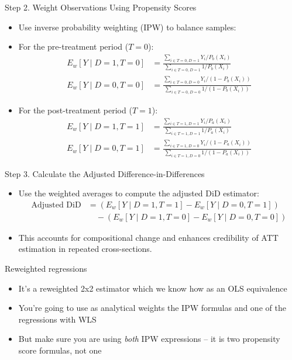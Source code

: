 \documentclass{beamer}
\begin{document}
\begin{frame}{Step 2. Weight Observations Using Propensity Scores}
\begin{itemize}
  \item Use inverse probability weighting (IPW) to balance samples:
    \item For the pre-treatment period (\( T = 0 \)):
  \begin{align*}
        E_w[Y \mid D = 1, T = 0] &= \frac{\sum_{i \in T=0, D=1} Y_i / P_b(X_i)}{\sum_{i \in T=0, D=1} 1 / P_b(X_i)} \\
        E_w[Y \mid D = 0, T = 0] &= \frac{\sum_{i \in T=0, D=0} Y_i / (1 - P_b(X_i))}{\sum_{i \in T=0, D=0} 1 / (1 - P_b(X_i))}
  \end{align*}
    \item For the post-treatment period (\( T = 1 \)):
  \begin{align*}
        E_w[Y \mid D = 1, T = 1] &= \frac{\sum_{i \in T=1, D=1} Y_i / P_a(X_i)}{\sum_{i \in T=1, D=1} 1 / P_a(X_i)} \\
        E_w[Y \mid D = 0, T = 1] &= \frac{\sum_{i \in T=1, D=0} Y_i / (1 - P_a(X_i))}{\sum_{i \in T=1, D=0} 1 / (1 - P_a(X_i))}
  \end{align*}
\end{itemize}
\end{frame}

\begin{frame}{Step 3. Calculate the Adjusted Difference-in-Differences}
\begin{itemize}
  \item Use the weighted averages to compute the adjusted DiD estimator:
  \begin{align*}
    \text{Adjusted DiD} &= \left( E_w[Y \mid D = 1, T = 1] - E_w[Y \mid D = 0, T = 1] \right) \nonumber \\
    &\quad - \left( E_w[Y \mid D = 1, T = 0] - E_w[Y \mid D = 0, T = 0] \right)
  \end{align*}
  \item This accounts for compositional change and enhances credibility of ATT estimation in repeated cross-sections.
\end{itemize}
\end{frame}


\begin{frame}{Reweighted regressions}

\begin{itemize}
\item It's a reweighted 2x2 estimator which we know how as an OLS equivalence
\item You're going to use as analytical weights the IPW formulas and one of the regressions with WLS
\item But make sure you are using \emph{both} IPW expressions -- it is two propensity score formulas, not one
\end{itemize}

\end{frame}
\end{document}
